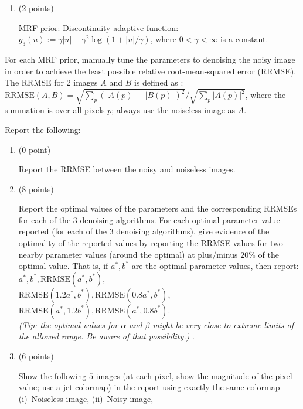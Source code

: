 \documentclass[12pt]{article}
\begin{document}
\begin {enumerate}
\begin {enumerate}
    MRF prior: Discontinuity-adaptive Huber function: $g_2 (u) := 0.5 |u|^2$, when $|u| \le \gamma$ and
    $g (u) := \gamma |u| - 0.5 \gamma^2$, when $|u| > \gamma$, where $0 < \gamma < \infty$ is a constant.
    
  \item (2 points)
    
    MRF prior: Discontinuity-adaptive function: $g_3 (u) := \gamma |u| - \gamma^2 \log (1 + |u| / \gamma)$,
    where $0 < \gamma < \infty$ is a constant.
  \end {enumerate}
  
  For each MRF prior, manually tune the parameters to denoising the noisy image in order to achieve the least
  possible relative root-mean-squared error (RRMSE). The RRMSE for 2
  images $A$ and $B$ is defined as : \\
  $\text{RRMSE}(A,B) = \sqrt {\sum_p (|A(p)| - |B(p)|)^2} / \sqrt {\sum_p |A(p)|^2}$, where the summation is
  over all pixels $p$; always use the noiseless image as $A$.
  
  Report the following:
  \begin {enumerate}
  \item (0 point)

    Report the RRMSE between the noisy and noiseless images.
    
  \item (8 points)

    Report the optimal values of the parameters and the corresponding RRMSEs for each of the 3 denoising
    algorithms.  For each optimal parameter value reported (for each of the 3 denoising algorithms), give
    evidence of the optimality of the reported values by reporting the RRMSE values for two nearby parameter
    values (around the optimal) at plus/minus $20\%$ of the optimal value. That is, if $a^*,b^*$ are
    the optimal parameter values, then report: \\ $a^*, b^*, \text{RRMSE}(a^*, b^*)$, \\
    $\text{RRMSE}(1.2 a^*, b^*), \text{RRMSE}(0.8 a^*, b^*)$, \\
    $\text{RRMSE}(a^*, 1.2 b^*), \text{RRMSE}(a^*, 0.8 b^*)$. \\
    {\em (Tip: the optimal values for $\alpha$ and $\beta$ might be very close to extreme limits of the
      allowed range. Be aware of that possibility.)  }.
    
  \item (6 points)
    
    Show the following $5$ images (at each pixel, show the magnitude of the pixel value; use a jet colormap)
    in the report using exactly the same colormap (i)~Noiseless image, (ii)~Noisy image,
    

\end{enumerate}
\end{enumerate}
\end{document}
